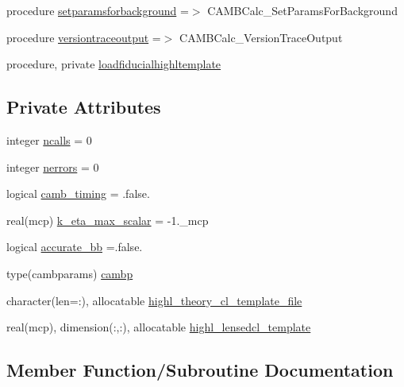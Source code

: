 \begin{DoxyCompactItemize}
\item 
procedure \mbox{\hyperlink{structcalculator__camb_1_1camb__calculator_a1e517d79e534958828b9f59c1a39be6b}{setparamsforbackground}} =$>$ C\+A\+M\+B\+Calc\+\_\+\+Set\+Params\+For\+Background
\item 
procedure \mbox{\hyperlink{structcalculator__camb_1_1camb__calculator_a4d32b2da90ffb62e5146016c9579422f}{versiontraceoutput}} =$>$ C\+A\+M\+B\+Calc\+\_\+\+Version\+Trace\+Output
\item 
procedure, private \mbox{\hyperlink{structcalculator__camb_1_1camb__calculator_a16a3e82ec53efa044703f4d9f14df49a}{loadfiducialhighltemplate}}
\end{DoxyCompactItemize}
\subsection*{Private Attributes}
\begin{DoxyCompactItemize}
\item 
integer \mbox{\hyperlink{structcalculator__camb_1_1camb__calculator_a12f320d27edc9dd7ce21bb813bdb3508}{ncalls}} = 0
\item 
integer \mbox{\hyperlink{structcalculator__camb_1_1camb__calculator_a5e91a7b9c53af26557d78d1b32852832}{nerrors}} = 0
\item 
logical \mbox{\hyperlink{structcalculator__camb_1_1camb__calculator_a7dbc90ec097aaffb820d2ac5578bd3cf}{camb\+\_\+timing}} = .false.
\item 
real(mcp) \mbox{\hyperlink{structcalculator__camb_1_1camb__calculator_a10f5887ea7ed4f1fd4a5f8adadf3f610}{k\+\_\+eta\+\_\+max\+\_\+scalar}} = -\/1.\+\_\+mcp
\item 
logical \mbox{\hyperlink{structcalculator__camb_1_1camb__calculator_aee00868ed6c11a1e4f7a044b4bf606df}{accurate\+\_\+bb}} =.false.
\item 
type(cambparams) \mbox{\hyperlink{structcalculator__camb_1_1camb__calculator_a0c197636ce80f1990a04e82f07240671}{cambp}}
\item 
character(len=\+:), allocatable \mbox{\hyperlink{structcalculator__camb_1_1camb__calculator_aeed315b63e03ad130a978a45c0f5687b}{highl\+\_\+theory\+\_\+cl\+\_\+template\+\_\+file}}
\item 
real(mcp), dimension(\+:,\+:), allocatable \mbox{\hyperlink{structcalculator__camb_1_1camb__calculator_a0db60094c8e869144342105a130be406}{highl\+\_\+lensedcl\+\_\+template}}
\end{DoxyCompactItemize}


\subsection{Member Function/\+Subroutine Documentation}
\mbox{\label{structcalculator__camb_1_1camb__calculator_a1523ae13a614c851c89b155b4b40c901}} 
